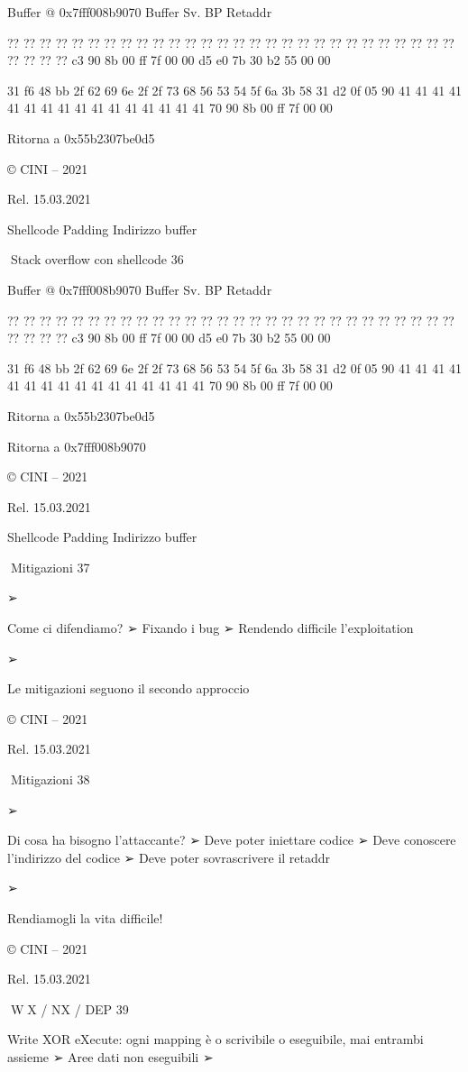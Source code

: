 \documentclass[11pt,a4paper]{article}
\begin{document}
Buffer @ 0x7fff008b9070 Buffer Sv. BP Retaddr

?? ?? ?? ?? ?? ?? ?? ?? ?? ?? ?? ?? ?? ?? ?? ?? ?? ?? ?? ?? ?? ?? ?? ??
?? ?? ?? ?? ?? ?? ?? ?? c3 90 8b 00 ff 7f 00 00 d5 e0 7b 30 b2 55 00 00

31 f6 48 bb 2f 62 69 6e 2f 2f 73 68 56 53 54 5f 6a 3b 58 31 d2 0f 05 90
41 41 41 41 41 41 41 41 41 41 41 41 41 41 41 41 70 90 8b 00 ff 7f 00 00

Ritorna a 0x55b2307be0d5

© CINI -- 2021

Rel. 15.03.2021

Shellcode Padding Indirizzo buffer

Stack overflow con shellcode 36

Buffer @ 0x7fff008b9070 Buffer Sv. BP Retaddr

?? ?? ?? ?? ?? ?? ?? ?? ?? ?? ?? ?? ?? ?? ?? ?? ?? ?? ?? ?? ?? ?? ?? ??
?? ?? ?? ?? ?? ?? ?? ?? c3 90 8b 00 ff 7f 00 00 d5 e0 7b 30 b2 55 00 00

31 f6 48 bb 2f 62 69 6e 2f 2f 73 68 56 53 54 5f 6a 3b 58 31 d2 0f 05 90
41 41 41 41 41 41 41 41 41 41 41 41 41 41 41 41 70 90 8b 00 ff 7f 00 00

Ritorna a 0x55b2307be0d5

Ritorna a 0x7fff008b9070

© CINI -- 2021

Rel. 15.03.2021

Shellcode Padding Indirizzo buffer

Mitigazioni 37

➢

Come ci difendiamo? ➢ Fixando i bug ➢ Rendendo difficile l'exploitation

➢

Le mitigazioni seguono il secondo approccio

© CINI -- 2021

Rel. 15.03.2021

Mitigazioni 38

➢

Di cosa ha bisogno l'attaccante? ➢ Deve poter iniettare codice ➢ Deve
conoscere l'indirizzo del codice ➢ Deve poter sovrascrivere il retaddr

➢

Rendiamogli la vita difficile!

© CINI -- 2021

Rel. 15.03.2021

W⊕X / NX / DEP 39

Write XOR eXecute: ogni mapping è o scrivibile o eseguibile, mai
entrambi assieme ➢ Aree dati non eseguibili ➢
\end{document}
